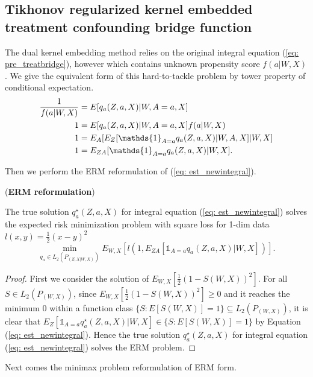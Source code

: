 \subsection{Tikhonov regularized kernel embedded treatment confounding bridge function}

The dual kernel embedding method relies on the original integral equation (\ref{eq: pre_treatbridge}), 
however which contains unknown propensity score $f(a|W,X)$. 
We give the equivalent form of this hard-to-tackle problem by tower property of conditional expectation. 
\begin{align}
    \label{eq: est_newintegral}
    \frac{1}{f(a|W,X)} &= E[q_a(Z,a,X)|W,A=a,X] \notag\\
    1 &= E[q_a(Z,a,X)|W,A=a,X]f(a|W,X) \notag\\
    1 &= E_A[E_Z[\mathds{1}_{A=a}q_a(Z,a,X)|W,A,X]|W,X] \notag\\
    1 &= E_{ZA}[\mathds{1}_{A=a}q_a(Z,a,X)|W,X]. 
\end{align}

Then we perform the ERM reformulation of (\ref{eq: est_newintegral}).
\begin{lemma}(\textbf{ERM reformulation})
    
    The true solution $q_a^{\star}(Z,a,X)$ for integral equation (\ref{eq: est_newintegral}) solves  
    the expected risk minimization problem with square loss for 1-dim data $l(x,y)=\frac{1}{2}(x-y)^2$ 
    \begin{equation}
        \label{eq: est_ERMreform}
        \min_{q_a\in L_2(P_{(Z,X|W,X)})} E_{W,X}[l(1, E_{ZA}[\mathds{1}_{A=a}q_a(Z,a,X)|W,X])]. 
    \end{equation}
\end{lemma}
\begin{proof}
    First we consider the solution of $E_{W,X}[\frac{1}{2}(1-S(W,X))^2]$.
    For all $S\in L_2(P_{(W,X)})$, 
    since $E_{W,X}[\frac{1}{2}(1-S(W,X))^2]\geq0$ and it reaches the minimum 0 within a function class $\{S: E[S(W,X)]=1\}\subseteq L_2(P_{(W,X)})$,   
    it is clear that $E_Z[\mathds{1}_{A=a}q_a^{\star}(Z,a,X)|W,X]\in\{S: E[S(W,X)]=1\}$ by Equation (\ref{eq: est_newintegral}). 
    Hence the true solution $q_a^{\star}(Z,a,X)$ for integral equation (\ref{eq: est_newintegral}) solves the ERM problem. 
\end{proof}

Next comes the minimax problem reformulation of ERM form. 

